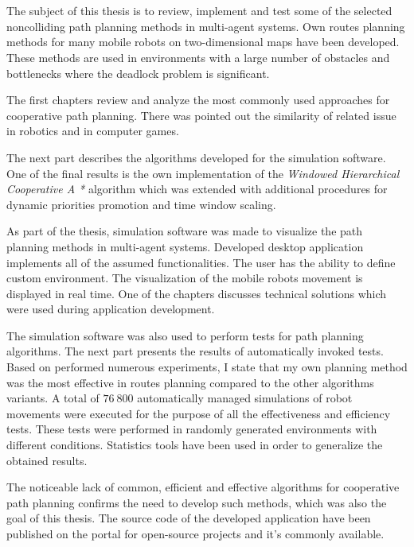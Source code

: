 \\

\\

\begin{singlespacing}

The subject of this thesis is to review, implement and test some of the selected noncolliding path planning methods in multi-agent systems.
Own routes planning methods for many mobile robots on two-dimensional maps have been developed.
These methods are used in environments with a large number of obstacles and bottlenecks where the deadlock problem is significant.

The first chapters review and analyze the most commonly used approaches for cooperative path planning.
There was pointed out the similarity of related issue in robotics and in computer games.

The next part describes the algorithms developed for the simulation software.
One of the final results is the own implementation of the {\it Windowed Hierarchical Cooperative A *} algorithm which was extended with additional procedures for dynamic priorities promotion and time window scaling.

As part of the thesis, simulation software was made to visualize the path planning methods in multi-agent systems.
Developed desktop application implements all of the assumed functionalities.
The user has the ability to define custom environment. The visualization of the mobile robots movement is displayed in real time.
One of the chapters discusses technical solutions which were used during application development.

The simulation software was also used to perform tests for path planning algorithms.
The next part presents the results of automatically invoked tests.
Based on performed numerous experiments, I state that my own planning method was the most effective in routes planning compared to the other algorithms variants.
A total of $76\ 800$ automatically managed simulations of robot movements were executed for the purpose of all the effectiveness and efficiency tests.
These tests were performed in randomly generated environments with different conditions.
Statistics tools have been used in order to generalize the obtained results.


The noticeable lack of common, efficient and effective algorithms for cooperative path planning confirms the need to develop such methods, which was also the goal of this thesis. The source code of the developed application have been published on the portal for open-source projects and it's commonly available.


\end{singlespacing}
